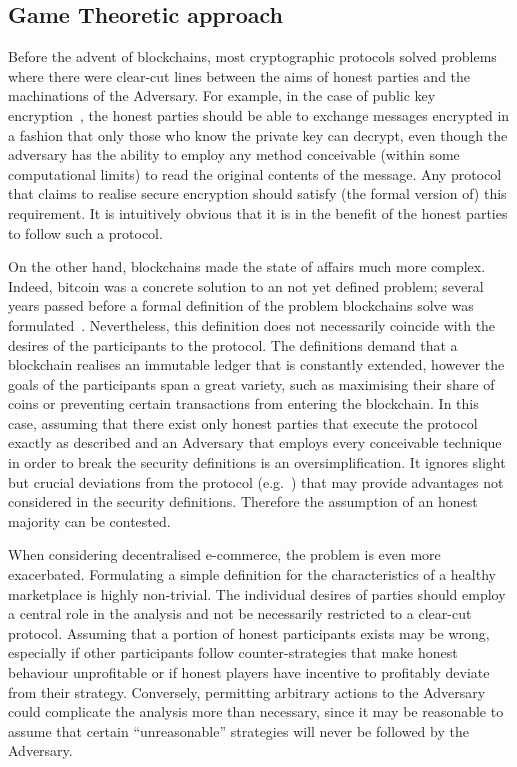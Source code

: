 \subsection{Game Theoretic approach}
  Before the advent of blockchains, most cryptographic protocols solved problems where
  there were clear-cut lines between the aims of honest parties and the machinations of
  the Adversary. For example, in the case of public key encryption~\cite{dh}, the honest
  parties should be able to exchange messages encrypted in a fashion that only those who
  know the private key can decrypt, even though the adversary has the ability to employ
  any method conceivable (within some computational limits) to read the original contents
  of the message. Any protocol that claims to realise secure encryption should satisfy
  (the formal version of) this requirement. It is intuitively obvious that it is in the
  benefit of the honest parties to follow such a protocol.

  On the other hand, blockchains made the state of affairs much more complex. Indeed,
  bitcoin was a concrete solution to an not yet defined problem; several years passed
  before a formal definition of the problem blockchains solve was
  formulated~\cite{backbone}. Nevertheless, this definition does not necessarily coincide
  with the desires of the participants to the protocol. The definitions demand that a
  blockchain realises an immutable ledger that is constantly extended, however the goals
  of the participants span a great variety, such as maximising their share of coins or
  preventing certain transactions from entering the blockchain. In this case, assuming
  that there exist only honest parties that execute the protocol exactly as described and
  an Adversary that employs every conceivable technique in order to break the security
  definitions is an oversimplification. It ignores slight but crucial deviations from the
  protocol (e.g.~\cite{selfishmine}) that may provide advantages not considered in the
  security definitions. Therefore the assumption of an honest majority can be contested.

  When considering decentralised e-commerce, the problem is even more exacerbated.
  Formulating a simple definition for the characteristics of a healthy marketplace is
  highly non-trivial. The individual desires of parties should employ a central role in
  the analysis and not be necessarily restricted to a clear-cut protocol. Assuming that a
  portion of honest participants exists may be wrong, especially if other participants
  follow counter-strategies that make honest behaviour unprofitable or if honest players
  have incentive to profitably deviate from their strategy. Conversely, permitting
  arbitrary actions to the Adversary could complicate the analysis more than necessary,
  since it may be reasonable to assume that certain ``unreasonable'' strategies will never
  be followed by the Adversary.

